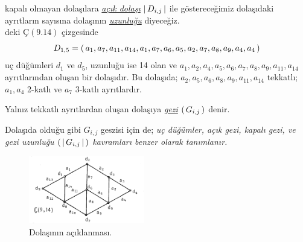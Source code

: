\documentclass[11pt]{amsbook}
\begin{document}
kapalı olmayan dolaşılara \underline{\itshape{açık dolaşı}} $\left \lvert \, D_{i,j} \, \right \rvert$ ile göstereceğimiz dolaşıdaki ayrıtların sayısına dolaşının \underline{\itshape{uzunluğu}} diyeceğiz.  \\
 deki $Ç(9.14)$ çizgesinde
$$D_{1,5} =  \left( \, a_1,a_7,a_{11},a_{14},a_1,a_7,a_6,a_5,a_2,a_7,a_8,a_9,a_4,a_4 \, \right) $$
uç düğümleri $d_1$ ve $d_5$, uzunluğu ise 14 olan ve $a_1,a_2,a_4,a_5,a_6,a_7,a_8,a_9,a_{11},a_{14}$ ayrıtlarından oluşan bir dolaşıdır. Bu dolaşıda; $a_2,a_5,a_6,a_8,a_9,a_{11},a_{14}$ tekkatlı; $a_1,a_4$ 2-katlı ve $a_7$ 3-katlı ayrıtlardır.

\begin{definition}
Yalnız tekkatlı ayrıtlardan oluşan dolaşıya \underline{\itshape{gezi}} $ \left( \, G_{i,j} \, \right) $ denir.
\end{definition}

Dolaşıda olduğu gibi $G_{i,j}$ geszisi için de; \itshape{uç düğümler, açık gezi, kapalı gezi, ve gezi uzunluğu} $ \left( \, \left \lvert \, G_{i,j} \, \right \rvert \, \right) $ kavramları benzer olarak tanımlanır.

 \begin{figure}[hb]
 	\centering
 	\includegraphics[width=0.45\textwidth]{images/ceyhun-016}
 	\caption{Dolaşının açıklanması.}
 	\label{1.2.1}
 \end{figure}
\end{document}
